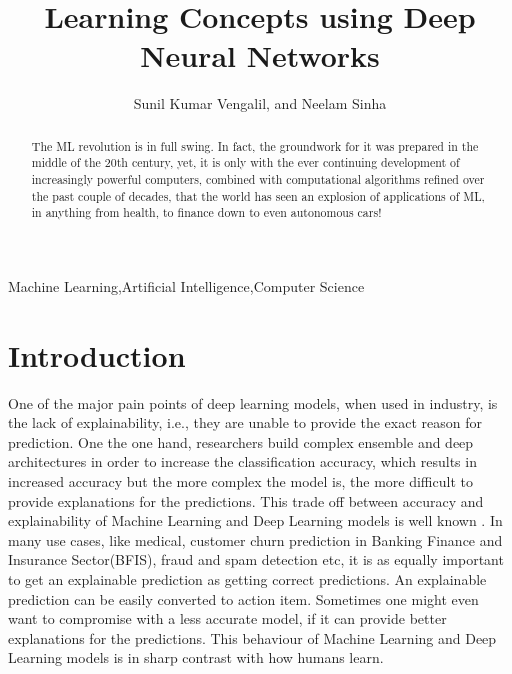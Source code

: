 \documentclass{JMLFS}
\begin{document}
\title{Learning Concepts using Deep Neural Networks}

\author{Sunil Kumar Vengalil, and Neelam Sinha}
\address{$^1$International Institute of Information Technology Bangalore}
\address{$^2$International Institute of Information Technology Bangalore}

\begin{abstract}
The ML revolution is in full swing. In fact, the groundwork for it was prepared in the middle of the 20th century, yet, it is only with the ever continuing development of increasingly powerful computers, combined with computational algorithms refined over the past couple of decades, that the world has seen an explosion of applications of ML, in anything from health, to finance down to even autonomous cars!
\end{abstract}

\maketitle

\begin{keyword}
Machine Learning\sep Artificial Intelligence\sep Computer Science
\end{keyword}

\section{Introduction}
One of the major pain points of deep learning models, when used in industry, is the lack of explainability, i.e., they are unable to provide the exact reason for prediction.
One the one hand, researchers build complex ensemble and deep architectures in order to increase the classification accuracy, which results in increased accuracy but the more complex the model is, the more difficult to provide explanations for the predictions.
This trade off between accuracy and explainability of Machine Learning and Deep Learning models is well known \cite{wu2021}.
In many use cases, like medical, customer churn prediction in Banking Finance and Insurance Sector(BFIS), fraud and spam detection etc, it is as equally important to get an explainable prediction as getting correct predictions.
An explainable prediction can be easily converted to action item.
Sometimes one might even want to compromise with a less accurate model, if it can provide better explanations for the predictions.
This behaviour of Machine Learning and Deep Learning models is in sharp contrast with how humans learn.
\end{document}
